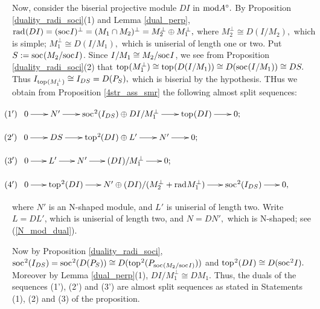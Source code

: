 \documentclass[10pt]{amsart}
\theoremstyle{definition}
\newcommand{\mmod}{{\rm mod}}
\newcommand{\rad}{{\rm rad}\hspace{.5pt}}
\newcommand{\soc}{{\rm soc}\hspace{.5pt}}
\newcommand{\ntop}{{\rm top}\hspace{.5pt}}
\newcommand{\hp}{\hspace{.5pt}}
\begin{document}
Now, consider the biserial projective module $DI$ in $\mmod A^\circ.$ By Proposition \ref{duality_radi_soci}(1) and Lemma \ref{dual_perp}, $\rad(DI)=(\soc I)^\perp=(M_1\cap M_2)^\perp=M_2^\perp \oplus M_1^\perp,$ where $M_2^\perp\cong D(I/M_2),$ which is simple; $M_1^\perp\cong D(I/M_1),$ which is uniserial of length one or two. Put $S:=\soc(M_2/\soc I)$. Since $I/M_1\cong M_2/\soc I$, we see from Proposition \ref{duality_radi_soci}(2) that $\ntop(M_1^\perp) \cong \ntop(D(I/M_1))\cong D(\soc(I/M_1))\cong DS.$ Thus \vspace{1pt} $I_{\ntop(M_1^\perp)}\cong I_{DS}= D(P_S),$ which is biserial by the hypothesis. THus we obtain from Proposition \ref{4str_ass_smr} the following almost split sequences\hp:

\vspace{2pt}

$\hspace{-10pt} (1') \hspace{5pt}  \xymatrixcolsep{20pt}\xymatrix{0\ar[r] & N'\ar[r] & 
\soc^2(I_{DS})\oplus DI/M_1^\perp \ar[r] & \ntop(DI) \ar[r] & 0;}$ 

\vspace{-2.5pt}

$\hspace{-10pt}(2') \hspace{5pt} \xymatrixcolsep{20pt} \xymatrix{0\ar[r] & DS \ar[r] & \ntop^2\hspace{-.5pt}(DI) \oplus L'\ar[r] & N'\ar[r] & 0;}$

\vspace{-2.5pt}

$\hspace{-10pt}(3') \hspace{5pt} \xymatrixcolsep{18pt}\xymatrix{0\ar[r] & L' \ar[r] & N' \ar[r] & (DI)/M_1^\perp \ar[r] & 0;}$

\vspace{-2.5pt}

$\hspace{-10pt}(4') \hspace{5pt} \xymatrixcolsep{18pt}\xymatrix{0\ar[r] & \ntop^2(DI)  \ar[r] & N' \oplus (DI)/(M_2^\perp+\rad M_1^\perp)\ar[r] & \soc^2(I_{DS})\ar[r] & 0,}$

\noindent where $N'$ is an N-shaped module, and $L'$ is uniserial of length two. 
Write $L=DL'$, which is uniserial of length two, and $N=DN',$ which is N-shaped; see (\ref{N_mod_dual}). 

Now by Proposition \ref{duality_radi_soci}, $\soc^2(I_{DS})=\soc^2(D(P_S))\cong D(\ntop^2(P_{\soc(M_2/\soc I)}))$ and  $\ntop^2(DI) \cong D(\soc^2I).$ Moreover by Lemma \ref{dual_perp}(1), $DI/M_1^\perp\cong DM_1.$ Thus, the duals of the sequences (1'), (2') and (3') are almost split sequences as stated in Statements (1), (2) and (3) of the proposition. 
\end{document}
